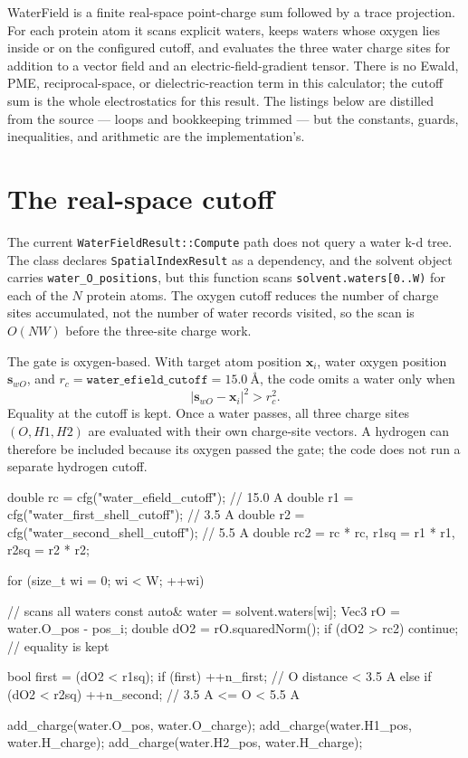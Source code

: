 \documentclass[11pt]{article}
\newcommand{\code}[1]{\texttt{#1}}
\begin{document}

WaterField is a finite real-space point-charge sum followed by a trace
projection. For each protein atom it scans explicit waters, keeps waters whose
oxygen lies inside or on the configured cutoff, and evaluates the three water
charge sites for addition to a vector field and an electric-field-gradient
tensor. There is no Ewald, PME, reciprocal-space, or dielectric-reaction term in
this calculator; the cutoff sum is the whole electrostatics for this result.
The listings below are distilled from the source --- loops and bookkeeping
trimmed --- but the constants, guards, inequalities, and arithmetic are the
implementation's.

\section{The real-space cutoff}

The current \code{WaterFieldResult::Compute} path does not query a water
k-d tree. The class declares \code{SpatialIndexResult} as a dependency, and the
solvent object carries \code{water\_O\_positions}, but this function scans
\code{solvent.waters[0..W)} for each of the \(N\) protein atoms. The oxygen
cutoff reduces the number of charge sites accumulated, not the number of water
records visited, so the scan is \(O(NW)\) before the three-site charge work.

The gate is oxygen-based. With target atom position \(\bm x_i\), water oxygen
position \(\bm s_{wO}\), and
\(r_c=\code{water\_efield\_cutoff}=\SI{15.0}{\angstrom}\), the code omits a
water only when
\[
  |\bm s_{wO}-\bm x_i|^2 > r_c^2 .
\]
Equality at the cutoff is kept. Once a water passes, all three charge sites
\((O,H1,H2)\) are evaluated with their own charge-site vectors. A hydrogen can
therefore be included because its oxygen passed the gate; the code does not run
a separate hydrogen cutoff.

\begin{codebox}
double rc  = cfg("water_efield_cutoff");        // 15.0 A
double r1  = cfg("water_first_shell_cutoff");   //  3.5 A
double r2  = cfg("water_second_shell_cutoff");  //  5.5 A
double rc2 = rc * rc, r1sq = r1 * r1, r2sq = r2 * r2;

for (size_t wi = 0; wi < W; ++wi) {             // scans all waters
    const auto& water = solvent.waters[wi];
    Vec3 rO = water.O_pos - pos_i;
    double dO2 = rO.squaredNorm();
    if (dO2 > rc2) continue;                    // equality is kept

    bool first = (dO2 < r1sq);
    if (first)      ++n_first;                  // O distance < 3.5 A
    else if (dO2 < r2sq) ++n_second;            // 3.5 A <= O < 5.5 A

    add_charge(water.O_pos,  water.O_charge);
    add_charge(water.H1_pos, water.H_charge);
    add_charge(water.H2_pos, water.H_charge);
}
\end{codebox}
\end{document}
